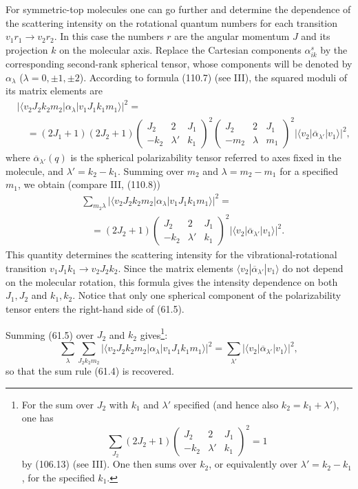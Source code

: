 For symmetric-top molecules one can go further and determine the dependence of the scattering intensity on the rotational quantum numbers for each transition $v_1r_1\to v_2r_2$. In this case the numbers $r$ are the angular momentum $J$ and its projection $k$ on the molecular axis. Replace the Cartesian components $\alpha^s_{ik}$ by the corresponding second-rank spherical tensor, whose components will be denoted by $\alpha_\lambda$ ($\lambda=0,\pm1,\pm2$). According to formula (110.7) (see III), the squared moduli of its matrix elements are
\[
\begin{aligned}
&|\langle v_2J_2k_2m_2|\alpha_\lambda|v_1J_1k_1m_1\rangle|^2={}\\
&\quad=(2J_1+1)(2J_2+1)
\begin{pmatrix}J_2&2&J_1\\-k_2&\lambda'&k_1\end{pmatrix}^{\!2}
\begin{pmatrix}J_2&2&J_1\\-m_2&\lambda&m_1\end{pmatrix}^{\!2}
|\langle v_2|\overline\alpha_{\lambda'}|v_1\rangle|^2,
\end{aligned}
\]
where $\overline\alpha_{\lambda'}(q)$ is the spherical polarizability tensor referred to axes fixed in the molecule, and $\lambda'=k_2-k_1$. Summing over $m_2$ and $\lambda=m_2-m_1$ for a specified $m_1$, we obtain (compare III, (110.8))
\begin{equation}
\begin{aligned}
&\sum_{m_2\lambda}
|\langle v_2J_2k_2m_2|\alpha_\lambda|v_1J_1k_1m_1\rangle|^2={}\\
&\quad=(2J_2+1)
\begin{pmatrix}J_2&2&J_1\\-k_2&\lambda'&k_1\end{pmatrix}^{\!2}
|\langle v_2|\overline\alpha_{\lambda'}|v_1\rangle|^2.
\end{aligned}
\tag{61.5}
\end{equation}
This quantity determines the scattering intensity for the vibrational-rotational transition $v_1J_1k_1\to v_2J_2k_2$. Since the matrix elements $\langle v_2|\overline\alpha_{\lambda'}|v_1\rangle$ do not depend on the molecular rotation, this formula gives the intensity dependence on both $J_1,J_2$ and $k_1,k_2$. Notice that only one spherical component of the polarizability tensor enters the right-hand side of (61.5).

Summing (61.5) over $J_2$ and $k_2$ gives\footnote{For the sum over $J_2$ with $k_1$ and $\lambda'$ specified (and hence also $k_2=k_1+\lambda'$), one has
\[
\sum_{J_2}(2J_2+1)
\begin{pmatrix}J_2&2&J_1\\-k_2&\lambda'&k_1\end{pmatrix}^{\!2}=1
\]
by (106.13) (see III). One then sums over $k_2$, or equivalently over $\lambda'=k_2-k_1$, for the specified $k_1$.}:
\[
\sum_\lambda\sum_{J_2k_2m_2}
|\langle v_2J_2k_2m_2|\alpha_\lambda|v_1J_1k_1m_1\rangle|^2
=\sum_{\lambda'}|\langle v_2|\overline\alpha_{\lambda'}|v_1\rangle|^2,
\]
so that the sum rule (61.4) is recovered.

